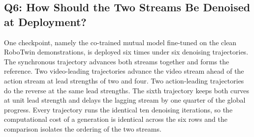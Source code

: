 \begin{table}[t]
\centering
\small
\caption{Q5, pretraining data recipe. Success rate after fine-tuning each
pretrained checkpoint on the clean RoboTwin demonstrations. Rows marked \tgt{}
carry pre-registered target values and the two unmarked rows are measured. The
last column reports the change in the randomized suite relative to the
no-pretraining reference.}
\label{tab:q5}
\end{table}

\subsection{Q6: How Should the Two Streams Be Denoised at Deployment?}
\label{sec:q6}

One checkpoint, namely the co-trained mutual model fine-tuned on the clean
RoboTwin demonstrations, is deployed six times under six denoising trajectories.
The synchronous trajectory advances both streams together and forms the
reference. Two video-leading trajectories advance the video stream ahead of the
action stream at lead strengths of two and four. Two action-leading trajectories
do the reverse at the same lead strengths. The sixth trajectory keeps both curves
at unit lead strength and delays the lagging stream by one quarter of the global
progress. Every trajectory runs the identical ten denoising iterations, so the
computational cost of a generation is identical across the six rows and the
comparison isolates the ordering of the two streams.

